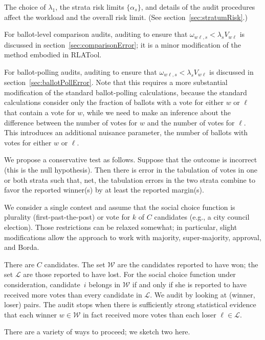\documentclass[12pt]{article}
\newcommand{\mc}[1]{\ensuremath{\mathcal{#1}}}
\begin{document}
The choice of $\lambda_1$, the strata risk limits $\{\alpha_s\}$, and details of the
audit procedures affect the workload and the overall risk limit.
(See section~\ref{sec:stratumRisk}.)

For ballot-level comparison audits, auditing to ensure that $\omega_{w\ell,s} < \lambda_s V_{w\ell}$
is discussed in section~\ref{sec:comparisonError}; it is a minor modification of the method
embodied in RLATool.

For ballot-polling audits, auditing to ensure that $\omega_{w\ell,s} < \lambda_s V_{w\ell}$ is discussed in section~\ref{sec:ballotPollError}.
Note that this requires a more substantial modification of the standard ballot-polling calculations,
because the standard calculations consider only the fraction of ballots with a vote for either 
$w$ or $\ell$ that contain a vote for $w$, while we need to make an inference about the 
difference between the number of votes for $w$ and the number of votes for $\ell$.
This introduces an additional nuisance parameter, the number of ballots with votes for either
$w$ or $\ell$.







We propose a conservative test as follows. 
Suppose that the outcome is incorrect (this is the null hypothesis).
Then there is error in the tabulation of votes in one or both strata such that, net,
the tabulation errors in the two strata combine to favor the reported winner(s)
by at least the reported margin(s).

We consider a single contest and assume that the
social choice function is plurality (first-past-the-post)
or vote for $k$ of $C$ candidates (e.g., a city council election).
Those restrictions can be relaxed somewhat; in particular, slight modifications allow
the approach to work with majority, super-majority, approval, and Borda.

There are $C$ candidates.
The set $\mc{W}$ are the candidates reported to have won; the set $\mc{L}$ are those
reported to have lost.
For the social choice function under consideration, candidate~$i$ belongs in $\mc{W}$ if and
only if she is reported to have received more votes than every candidate in $\mc{L}$.
We audit by looking at (winner, loser) pairs.
The audit stops when there is sufficiently strong statistical evidence that each winner 
$w \in \mc{W}$ in fact received more votes
than each loser $\ell \in \mc{L}$.

There are a variety of ways to proceed; we sketch two here.
\end{document}
